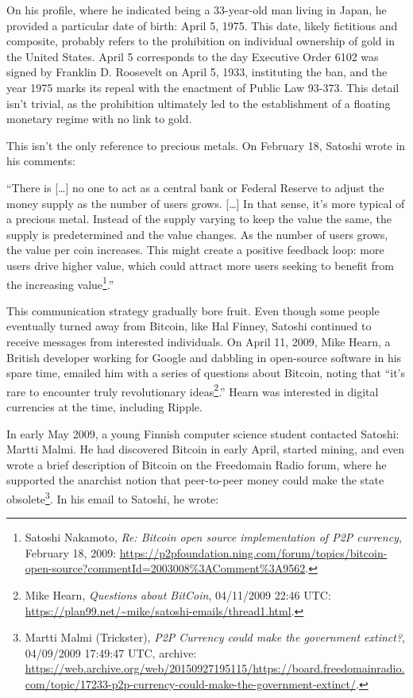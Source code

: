 \documentclass[
  a5paper,
  smalldemyvopaper,10pt,twoside,onecolumn,openright,extrafontsizes,hidelinks]{memoir}
\begin{document}
On his profile, where he indicated being a 33-year-old man living in
Japan, he provided a particular date of birth: April 5, 1975. This date,
likely fictitious and composite, probably refers to the prohibition on
individual ownership of gold in the United States. April 5 corresponds
to the day Executive Order 6102 was signed by Franklin D. Roosevelt on
April 5, 1933, instituting the ban, and the year 1975 marks its repeal
with the enactment of Public Law 93-373. This detail isn't trivial, as
the prohibition ultimately led to the establishment of a floating
monetary regime with no link to gold.

This isn't the only reference to precious metals. On February 18,
Satoshi wrote in his comments:

``There is {[}\ldots{]} no one to act as a central bank or Federal
Reserve to adjust the money supply as the number of users grows.
{[}\ldots{]} In that sense, it's more typical of a precious metal.
Instead of the supply varying to keep the value the same, the supply is
predetermined and the value changes. As the number of users grows, the
value per coin increases. This might create a positive feedback loop:
more users drive higher value, which could attract more users seeking to
benefit from the increasing value\footnote{Satoshi Nakamoto, \emph{Re:
  Bitcoin open source implementation of P2P currency}, February 18,
  2009:
  \url{https://p2pfoundation.ning.com/forum/topics/bitcoin-open-source?commentId=2003008\%3AComment\%3A9562}.}.''

This communication strategy gradually bore fruit. Even though some
people eventually turned away from Bitcoin, like Hal Finney, Satoshi
continued to receive messages from interested individuals. On April 11,
2009, Mike Hearn, a British developer working for Google and dabbling in
open-source software in his spare time, emailed him with a series of
questions about Bitcoin, noting that ``it's rare to encounter truly
revolutionary ideas\footnote{Mike Hearn, \emph{Questions about BitCoin},
  04/11/2009 22:46 UTC:
  \url{https://plan99.net/~mike/satoshi-emails/thread1.html}.}.'' Hearn
was interested in digital currencies at the time, including Ripple.

In early May 2009, a young Finnish computer science student contacted
Satoshi: Martti Malmi. He had discovered Bitcoin in early April, started
mining, and even wrote a brief description of Bitcoin on the Freedomain
Radio forum, where he supported the anarchist notion that peer-to-peer
money could make the state obsolete\footnote{Martti Malmi (Trickster),
  \emph{P2P Currency could make the government extinct?}, 04/09/2009
  17:49:47 UTC, archive:
  \url{https://web.archive.org/web/20150927195115/https://board.freedomainradio.com/topic/17233-p2p-currency-could-make-the-government-extinct/}.}.
In his email to Satoshi, he wrote:
\end{document}

